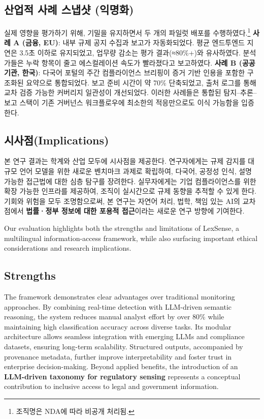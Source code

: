 {\subsection{산업적 사례 스냅샷 (익명화)}
실제 영향을 평가하기 위해, 기밀을 유지하면서 두 개의 파일럿 배포를 수행하였다.\footnote{조직명은 NDA에 따라 비공개 처리됨.}
\textbf{사례 A (금융, EU)}: 내부 규제 공지 수집과 보고가 자동화되었다. 평균 엔드투엔드 지연은 3.5초 이하로 유지되었고, 업무량 감소는 평가 결과(≈80\%+)와 유사하였다. 분석가들은 누락 항목이 줄고 에스컬레이션 속도가 빨라졌다고 보고하였다.  
\textbf{사례 B (공공기관, 한국)}: 다국어 포털의 주간 컴플라이언스 브리핑이 증거 기반 인용을 포함한 구조화된 요약으로 통합되었다. 보고 준비 시간이 약 70\% 단축되었고, 출처 로그를 통해 교차 검증 가능한 커버리지 일관성이 개선되었다.  
이러한 사례들은 통합된 탐지–추론–보고 스택이 기존 거버넌스 워크플로우에 최소한의 적응만으로도 이식 가능함을 입증한다.

\subsection{시사점(Implications)}
본 연구 결과는 학계와 산업 모두에 시사점을 제공한다. 
연구자에게는 규제 감지를 대규모 언어 모델을 위한 새로운 벤치마크 과제로 확립하여, 다국어, 공정성 인식, 설명 가능한 접근법에 대한 심층 탐구를 장려한다. 
실무자에게는 기업 컴플라이언스를 위한 확장 가능한 인프라를 제공하여, 조직이 실시간으로 규제 동향을 추적할 수 있게 한다. 
기회와 위험을 모두 조명함으로써, 본 연구는 자연어 처리, 법학, 책임 있는 AI의 교차점에서 \textbf{법률·정부 정보에 대한 포용적 접근}이라는 새로운 연구 방향에 기여한다. 


}{%


Our evaluation highlights both the strengths and limitations of LexSense, a multilingual information-access framework, while also surfacing important ethical considerations and research implications. 

\subsection{Strengths}
The framework demonstrates clear advantages over traditional monitoring approaches. 
By combining real-time detection with LLM-driven semantic reasoning, the system reduces manual analyst effort by over 80\% while maintaining high classification accuracy across diverse tasks. 
Its modular architecture allows seamless integration with emerging LLMs and compliance datasets, ensuring long-term scalability. 
Structured outputs, accompanied by provenance metadata, further improve interpretability and foster trust in enterprise decision-making. 
Beyond applied benefits, the introduction of an \textbf{LLM-driven taxonomy for regulatory sensing} represents a conceptual contribution to inclusive access to legal and government information.

}
